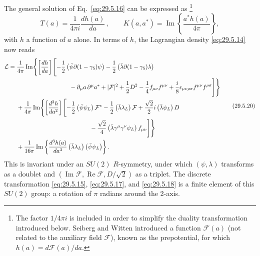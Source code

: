 The general solution of Eq.~\eqref{eq:29.5.16} can be expressed as
\footnote{The factor \(1/4\pi i\) is included in order to simplify the
duality transformation introduced below. Seiberg and Witten introduced a
function \(\mathcal{F}(a)\) (not related to the auxiliary field
\(\mathcal{F}\)), known as the prepotential, for which
\(h(a)=d\mathcal{F}(a)/da\).}
\begin{equation}
  T(a)=\frac{1}{4\pi i}\frac{dh(a)}{da}\,,
  \qquad
  K(a,a^*)=\operatorname{Im}\left\{\frac{a^*h(a)}{4\pi}\right\},
  \tag{29.5.19}\label{eq:29.5.19}
\end{equation}
with \(h\) a function of \(a\) alone. In terms of \(h\), the Lagrangian
density \eqref{eq:29.5.14} now reads
\begin{equation}
  \begin{aligned}
  \mathcal{L}
  ={}&\frac{1}{4\pi}\operatorname{Im}\Biggl\{
    \left[\frac{dh}{da}\right]\Biggl[
      -\frac12\left(\bar\psi\sl{\partial}(1-\gamma_5)\psi\right)
      -\frac12\left(\bar\lambda\sl{\partial}(1-\gamma_5)\lambda\right)
  \\
  &\hspace{31mm}
      -\partial_\mu a\,\partial^\mu a^*
      +\lvert\mathcal{F}\rvert^2+\frac12D^2
      -\frac14f_{\mu\nu}f^{\mu\nu}
      +\frac{i}{8}\epsilon_{\mu\nu\rho\sigma}
        f^{\mu\nu}f^{\rho\sigma}
    \Biggr]\Biggr\}
  \\
  &+\frac{1}{4\pi}\operatorname{Im}\Biggl\{
    \left[\frac{d^2h}{da^2}\right]\Biggl[
      -\frac12\left(\bar\psi\psi_L\right)\mathcal{F}^*
      -\frac12\left(\bar\lambda\lambda_L\right)\mathcal{F}
      +\frac{\sqrt{2}}{2}i\left(\bar\lambda\psi_L\right)D
  \\
  &\hspace{43mm}
      -\frac{\sqrt{2}}{4}
        \left(\bar\lambda\gamma^\mu\gamma^\nu\psi_L\right)f_{\mu\nu}
    \Biggr]\Biggr\}
  \\
  &+\frac{1}{16\pi}\operatorname{Im}\left\{
    \frac{d^3h(a)}{da^3}
    \left(\bar\lambda\lambda_L\right)\left(\bar\psi\psi_L\right)
  \right\}.
  \end{aligned}
  \tag{29.5.20}\label{eq:29.5.20}
\end{equation}
This is invariant under an \(SU(2)\) \(R\)-symmetry, under which
\((\psi,\lambda)\) transforms as a doublet and
\((\operatorname{Im}\mathcal{F},\operatorname{Re}\mathcal{F},D/\sqrt{2})\)
as a triplet. The discrete transformation \eqref{eq:29.5.15},
\eqref{eq:29.5.17}, and \eqref{eq:29.5.18} is a finite element of this
\(SU(2)\) group: a rotation of \(\pi\) radians around the 2-axis.

